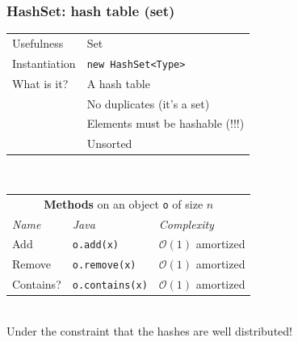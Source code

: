 \documentclass[8pt,aspectratio=169]{beamer}
\begin{document}
\begin{frame}
\frametitle{HashSet: hash table (set)}
\centering
\begin{tabular}{ll}
	Usefulness & Set\\
	Instantiation & \texttt{new HashSet<Type>}\\
	What is it? & A hash table\\
	& \color{red} No duplicates (it's a set)\\
	& \color{red} Elements must be hashable (!!!)\\
	& \color{red} Unsorted
	
\end{tabular}\\
\vspace{0.5cm}
\centering
\begin{tabular}{lll}
	\multicolumn{3}{c}{\textbf{Methods} on an object \texttt{o} of size $n$} \\
	\textit{Name} & \textit{Java} & \textit{Complexity} \\
	Add & \texttt{o.add(x)} & $\mathcal{O}(1)$ \color{orange} amortized\\
	Remove & \texttt{o.remove(x)} & $\mathcal{O}(1)$ \color{orange} amortized\\
	Contains? & \texttt{o.contains(x)} & $\mathcal{O}(1)$ \color{orange} amortized\\
\end{tabular}\\
\vspace{0.5cm}
\color{blue} Under the constraint that the hashes are well distributed!
\end{frame}
\end{document}
